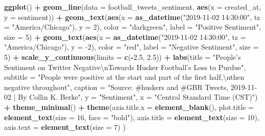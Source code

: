 \documentclass[]{book}
\newenvironment{Shaded}{\begin{snugshade}}{\end{snugshade}}
\newcommand{\CharTok}[1]{\textcolor[rgb]{0.31,0.60,0.02}{#1}}
\newcommand{\DataTypeTok}[1]{\textcolor[rgb]{0.13,0.29,0.53}{#1}}
\newcommand{\DecValTok}[1]{\textcolor[rgb]{0.00,0.00,0.81}{#1}}
\newcommand{\FloatTok}[1]{\textcolor[rgb]{0.00,0.00,0.81}{#1}}
\newcommand{\KeywordTok}[1]{\textcolor[rgb]{0.13,0.29,0.53}{\textbf{#1}}}
\newcommand{\NormalTok}[1]{#1}
\newcommand{\OperatorTok}[1]{\textcolor[rgb]{0.81,0.36,0.00}{\textbf{#1}}}
\newcommand{\StringTok}[1]{\textcolor[rgb]{0.31,0.60,0.02}{#1}}
\begin{document}
\begin{Shaded}
\begin{Highlighting}[]
\KeywordTok{ggplot}\NormalTok{() }\OperatorTok{+}
\StringTok{  }\KeywordTok{geom_line}\NormalTok{(}\DataTypeTok{data =}\NormalTok{ football_tweets_sentiment, }\KeywordTok{aes}\NormalTok{(}\DataTypeTok{x =}\NormalTok{ created_at, }\DataTypeTok{y =}\NormalTok{ sentiment)) }\OperatorTok{+}
\StringTok{  }\KeywordTok{geom_text}\NormalTok{(}\KeywordTok{aes}\NormalTok{(}\DataTypeTok{x =} \KeywordTok{as_datetime}\NormalTok{(}\StringTok{"2019-11-02 14:30:00"}\NormalTok{, }\DataTypeTok{tz =} \StringTok{"America/Chicago"}\NormalTok{), }\DataTypeTok{y =} \DecValTok{2}\NormalTok{), }\DataTypeTok{color =} \StringTok{"darkgreen"}\NormalTok{, }\DataTypeTok{label =} \StringTok{"Positive Sentiment"}\NormalTok{, }\DataTypeTok{size =} \DecValTok{5}\NormalTok{) }\OperatorTok{+}
\StringTok{  }\KeywordTok{geom_text}\NormalTok{(}\KeywordTok{aes}\NormalTok{(}\DataTypeTok{x =} \KeywordTok{as_datetime}\NormalTok{(}\StringTok{"2019-11-02 14:30:00"}\NormalTok{, }\DataTypeTok{tz =} \StringTok{"America/Chicago"}\NormalTok{), }\DataTypeTok{y =} \DecValTok{-2}\NormalTok{), }\DataTypeTok{color =} \StringTok{"red"}\NormalTok{, }\DataTypeTok{label =} \StringTok{"Negative Sentiment"}\NormalTok{, }\DataTypeTok{size =} \DecValTok{5}\NormalTok{) }\OperatorTok{+}
\StringTok{  }\KeywordTok{scale_y_continuous}\NormalTok{(}\DataTypeTok{limits =} \KeywordTok{c}\NormalTok{(}\OperatorTok{-}\FloatTok{2.5}\NormalTok{, }\FloatTok{2.5}\NormalTok{)) }\OperatorTok{+}
\StringTok{  }\KeywordTok{labs}\NormalTok{(}\DataTypeTok{title =} \StringTok{"People's Sentiment on Twitter Negative}\CharTok{\textbackslash{}n}\StringTok{Towards Husker Football's Loss to Purdue"}\NormalTok{,}
       \DataTypeTok{subtitle =} \StringTok{"People were positive at the start and part of the first half,}\CharTok{\textbackslash{}n}\StringTok{then negative throughout"}\NormalTok{,}
       \DataTypeTok{caption =} \StringTok{"Source: #huskers and #GBR Tweets, 2019-11-02 | By Collin K. Berke"}\NormalTok{,}
       \DataTypeTok{y =} \StringTok{"Sentiment"}\NormalTok{,}
       \DataTypeTok{x =} \StringTok{"Central Standard Time (CST)"}\NormalTok{) }\OperatorTok{+}\StringTok{ }
\StringTok{  }\KeywordTok{theme_minimal}\NormalTok{() }\OperatorTok{+}
\StringTok{  }\KeywordTok{theme}\NormalTok{(}\DataTypeTok{axis.title.x =} \KeywordTok{element_blank}\NormalTok{(),}
        \DataTypeTok{plot.title =} \KeywordTok{element_text}\NormalTok{(}\DataTypeTok{size =} \DecValTok{16}\NormalTok{, }\DataTypeTok{face =} \StringTok{"bold"}\NormalTok{),}
    \DataTypeTok{axis.title =} \KeywordTok{element_text}\NormalTok{(}\DataTypeTok{size =} \DecValTok{10}\NormalTok{),}
    \DataTypeTok{axis.text =} \KeywordTok{element_text}\NormalTok{(}\DataTypeTok{size =} \DecValTok{7}\NormalTok{)}
\NormalTok{  )}
\end{Highlighting}
\end{Shaded}
\end{document}

